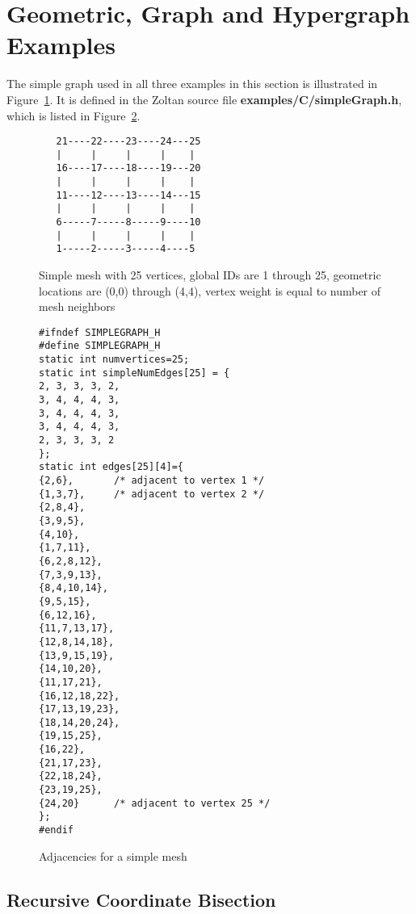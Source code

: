 \clearpage
\section{Geometric, Graph and Hypergraph Examples}

The simple graph used in all three examples in this section
is illustrated in Figure~\ref{fig:mesh25}.
It is defined in the Zoltan source file \textbf{examples/C/simpleGraph.h},
which is listed in Figure~\ref{fig:simpleGraphDotH}.

\begin{figure}[bottom]
\label{fig:mesh25}
\begin{center}
\begin{verbatim}
   21----22----23----24---25
   |     |     |     |    |
   16----17----18----19---20
   |     |     |     |    |
   11----12----13----14---15
   |     |     |     |    |
   6-----7-----8-----9----10
   |     |     |     |    |
   1-----2-----3-----4----5
\end{verbatim}
\caption{Simple mesh with 25 vertices, global IDs are 1 through 25, geometric locations are (0,0) through (4,4), vertex weight is equal to number of mesh neighbors}
\end{center}
\end{figure}

\begin{figure}
\label{fig:simpleGraphDotH}
\begin{flushleft}
\begin{verbatim}
#ifndef SIMPLEGRAPH_H
#define SIMPLEGRAPH_H
static int numvertices=25;
static int simpleNumEdges[25] = {
2, 3, 3, 3, 2,
3, 4, 4, 4, 3,
3, 4, 4, 4, 3,
3, 4, 4, 4, 3,
2, 3, 3, 3, 2
};
static int edges[25][4]={
{2,6},       /* adjacent to vertex 1 */
{1,3,7},     /* adjacent to vertex 2 */
{2,8,4},
{3,9,5},
{4,10},
{1,7,11},
{6,2,8,12},
{7,3,9,13},
{8,4,10,14},
{9,5,15},
{6,12,16},
{11,7,13,17},
{12,8,14,18},
{13,9,15,19},
{14,10,20},
{11,17,21},
{16,12,18,22},
{17,13,19,23},
{18,14,20,24},
{19,15,25},
{16,22},
{21,17,23},
{22,18,24},
{23,19,25},
{24,20}      /* adjacent to vertex 25 */
};
#endif
\end{verbatim}
\end{flushleft}
\caption{Adjacencies for a simple mesh}
\end{figure}


\clearpage
\subsection{Recursive Coordinate Bisection}
\label{sec:rcb}

